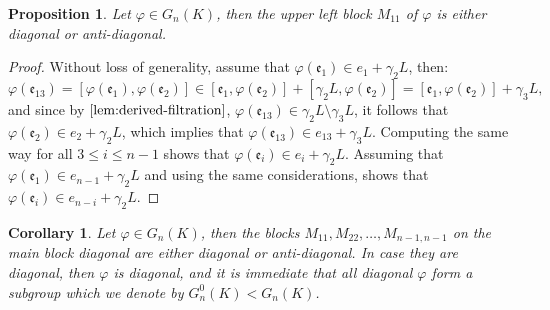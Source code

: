\documentclass{article}
\newtheorem{proposition4}[paragraph]{Proposition}
\newtheorem{corollary4}[paragraph]{Corollary}
\newcommand{\e}{\mathfrak{e}}
\begin{document}
\begin{proposition4}
\label{prop:block-diag-anti-diag}
Let $\varphi\in{G}_n(K)$, then the upper left block $M_{11}$ of $\varphi$ is either diagonal or anti-diagonal.
\end{proposition4}
\begin{proof}
Without loss of generality, assume that $\varphi(\e_1)\in{e}_1+\gamma_2{L}$, then:
\[\varphi(\e_{13})=[\varphi(\e_1),\varphi(\e_2)]\in[\e_1,\varphi(\e_2)]+[\gamma_2{L},\varphi(\e_2)]=[\e_1,\varphi(\e_2)]+\gamma_3{L},\]
and since by $\ref{lem:derived-filtration}$, $\varphi(\e_{13})\in\gamma_2{L}\setminus\gamma_3{L}$, it follows that $\varphi(\e_2)\in{e}_2+\gamma_2{L}$, which implies that $\varphi(\e_{13})\in{e}_{13}+\gamma_3{L}$. Computing the same way for all $3\leq{i}\leq{n-1}$ shows that $\varphi(\e_i)\in{e}_i+\gamma_2{L}$. Assuming that $\varphi(\e_1)\in{e}_{n-1}+\gamma_2{L}$ and using the same considerations, shows that $\varphi(\e_i)\in{e}_{n-i}+\gamma_2{L}$.
\end{proof}
\begin{corollary4}
\label{cor:matrix-diag-anti-diag}
Let $\varphi\in{G}_n(K)$, then the blocks $M_{11},M_{22},\dots,M_{n-1,n-1}$ on the main block diagonal are either diagonal or anti-diagonal. In case they are diagonal, then $\varphi$ is diagonal, and it is immediate that all diagonal $\varphi$ form a subgroup which we denote by $G_n^0(K)<G_n(K)$.
\end{corollary4}
\end{document}
